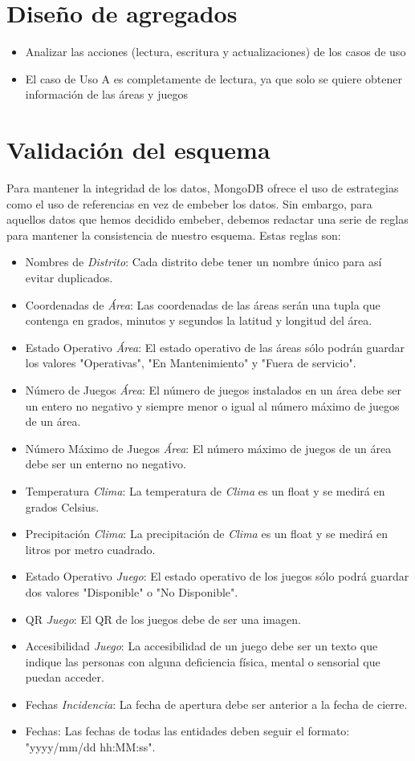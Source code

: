 \documentclass[]{article}
\begin{document}
\section{Diseño de agregados}
\label{sec:agregados}
\begin{itemize}
    \item Analizar las acciones (lectura, escritura y actualizaciones) de los casos de uso
    \item El caso de Uso A es completamente de lectura, ya que solo se quiere obtener información de las áreas y juegos
\end{itemize}

\section{Validación del esquema}
\label{sec:esquema}
Para mantener la integridad de los datos, MongoDB ofrece el uso de estrategias como el uso de referencias en vez de embeber los datos. Sin embargo, para aquellos datos que hemos decidido embeber, debemos redactar una serie de reglas para mantener la consistencia de nuestro esquema. Estas reglas son:
\begin{itemize}
    \item Nombres de \textit{Distrito}: Cada distrito debe tener un nombre único para así evitar duplicados.
    \item Coordenadas de \textit{Área}: Las coordenadas de las áreas serán una tupla que contenga en grados, minutos y segundos la latitud y longitud del área.
    \item Estado Operativo \textit{Área}: El estado operativo de las áreas sólo podrán guardar los valores "Operativas", "En Mantenimiento" y "Fuera de servicio".
    \item Número de Juegos \textit{Área}: El número de juegos instalados en un área debe ser un entero no negativo y siempre menor o igual al número máximo de juegos de un área.
    \item Número Máximo de Juegos \textit{Área}: El número máximo de juegos de un área debe ser un enterno no negativo.
    \item Temperatura \textit{Clima}: La temperatura de \textit{Clima} es un float y se medirá en grados Celsius.
    \item Precipitación \textit{Clima}: La precipitación de \textit{Clima} es un float y se medirá en litros por metro cuadrado.
    \item Estado Operativo \textit{Juego}: El estado operativo de los juegos sólo podrá guardar dos valores "Disponible" o "No Disponible".
    \item QR \textit{Juego}: El QR de los juegos debe de ser una imagen.
    \item Accesibilidad \textit{Juego}: La accesibilidad de un juego debe ser un texto que indique las personas con alguna deficiencia física, mental o sensorial que puedan acceder.
    \item Fechas \textit{Incidencia}: La fecha de apertura debe ser anterior a la fecha de cierre.
    \item Fechas: Las fechas de todas las entidades deben seguir el formato: "yyyy/mm/dd hh:MM:ss".
\end{itemize}
\end{document}
